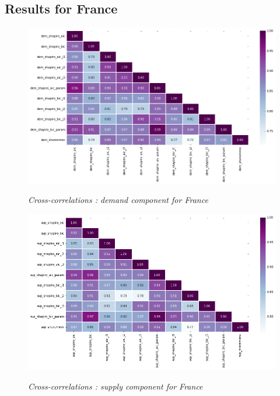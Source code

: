 \subsection{Results for France}

\begin{figure}[h!]
    \centering
    \caption{\textit{Cross-correlations : demand component for France}}
    \includegraphics[width=1\textwidth]{img/dem_heat.png}
    \label{figure:dem_heat}
\end{figure}
\begin{figure}[h!]
    \centering
    \caption{\textit{Cross-correlations : supply component for France}}
    \includegraphics[width=1\textwidth]{img/sup_heat.png}
    \label{figure:sup_heat}
\end{figure}
